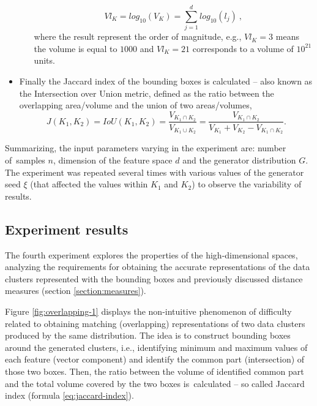 \begin{itemize}
\begin{itemize}
                    \begin{equation}
                        {Vl}_K = log_{10}(V_K) = \sum_{j=1}^d log_{10}(l_j)
                        ~,
                        \label{eq:hyperrectangle-volume-log}
                    \end{equation}
                    where the result represent the order of magnitude, e.g., ${Vl}_K = 3$ means the volume is equal to $1000$ and ${Vl}_K = 21$ corresponds to a volume of ${10}^{21}$ units.
          \end{itemize}
    \item Finally the Jaccard index of the bounding boxes is calculated – also known as the Intersection over Union metric, defined as the ratio between the overlapping area/volume and the union of two areas/volumes,
          \begin{equation}
              J(K_1, K_2)
              =
              IoU(K_1, K_2)
              =
              \frac{
                  V_{K_1 \cap K_2}
              }{
                  V_{K_1 \cup K_2}
              }
              =
              \frac{
                  V_{K_1 \cap K_2}
              }{
                  V_{K_1} + V_{K_2} - V_{K_1 \cap K_2}
              }
              .
              \label{eq:jaccard-index}
          \end{equation}
\end{itemize}

Summarizing, the input parameters varying in the experiment are: number of~samples $n$, dimension of the feature space $d$ and the generator distribution $G$. The experiment was repeated several times with various values of the generator seed $\xi$ (that affected the values within $K_1$ and $K_2$) to observe the variability of results.


\subsection{Experiment results}
\label{section:overlapping-results}

The fourth experiment explores the properties of the high-dimensional spaces, analyzing the requirements for obtaining the accurate representations of the data clusters represented with the bounding boxes and previously discussed distance measures (section \ref{section:measures}).

Figure \ref{fig:overlapping-1} displays the non-intuitive phenomenon of difficulty related to obtaining matching (overlapping) representations of two data clusters produced by the same distribution. The idea is to construct bounding boxes around the generated clusters, i.e., identifying minimum and maximum values of each feature (vector component) and identify the common part (intersection) of those two boxes. Then, the ratio between the volume of identified common part and the total volume covered by the two boxes is~calculated – so called Jaccard index (formula \ref{eq:jaccard-index}).


